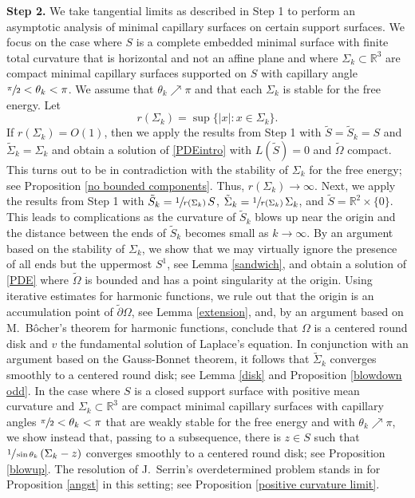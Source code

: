 \documentclass[11pt]{amsart}
\begin{document}
\textbf{Step 2.} We take tangential limits as  described in Step 1 to perform an asymptotic analysis of minimal capillary surfaces on certain support surfaces. We focus on the case where $S$ is a complete embedded minimal surface with finite total curvature that is horizontal and not an affine plane and where  $\Sigma_k\subset \mathbb{R}^3$ are  compact minimal capillary surfaces supported on $S$ with capillary angle $\sfrac{\pi}2<\theta_k<\pi$. We assume that $\theta_k\nearrow \pi$ and that each $\Sigma_k$ is stable for the free energy. Let  $$r(\Sigma_k)=\sup\{|x|:x\in \Sigma_k\}.$$ If $r(\Sigma_k)=O(1)$, then we apply the results from Step 1 with $\tilde S=\tilde S_k=S$ and $\tilde \Sigma_k=\Sigma_k$  and obtain a solution of \eqref{PDEintro} with $L(\tilde S)=0$ and $\tilde \Omega$ compact. This turns out to be in contradiction with the stability of $\Sigma_k$ for the free energy; see Proposition \ref{no bounded components}. Thus, $r(\Sigma_k)\to \infty$. Next, we  apply the results from Step 1 with $\tilde S_k=\sfrac{1}{r(\Sigma_k)}\, S$, $\tilde  \Sigma_k=\sfrac{1}{r(\Sigma_k)}\,\Sigma_k$, and $\tilde S=\mathbb{R}^2\times \{0\}$. This leads to complications as the curvature of $\tilde S_k$ blows up near the origin and the distance between the ends of $\tilde S_k$ becomes small as $k\to \infty$. By an argument based on the stability of $\Sigma_k$, we show that we may virtually ignore the presence of all ends but the uppermost $S^1$, see  Lemma \ref{sandwich}, and obtain a solution of \eqref{PDE} where $\tilde \Omega$ is bounded and has a point singularity at the origin. Using iterative estimates for harmonic functions, we rule out that the origin is an accumulation point of $\tilde \partial \Omega$, see Lemma \ref{extension}, and, by an argument based on M.~B\^ocher's theorem for harmonic functions, conclude that $\Omega$ is a centered round disk and $v$ the fundamental solution of Laplace's equation. In conjunction with an argument based on the Gauss-Bonnet theorem, it follows that $\tilde \Sigma_k$ converges smoothly to a centered round disk; see Lemma \ref{disk} and Proposition \ref{blowdown odd}. In the case where $S$ is a closed support surface with positive mean curvature and $\Sigma_k\subset \mathbb{R}^3$ are compact minimal capillary surfaces with capillary angles $\sfrac{\pi}2<\theta_k<\pi$ that are weakly stable for the free energy and with $\theta_k\nearrow \pi$,  we show instead that, passing to a subsequence, there is $z\in S$ such that $\sfrac{1}{\sin \theta_k}\,(\Sigma_k-z)$ converges smoothly to a centered round disk; see Proposition \ref{blowup}. The resolution of J.~Serrin's overdetermined problem stands in for Proposition \ref{angst} in this setting; see Proposition \ref{positive curvature limit}.
\end{document}
